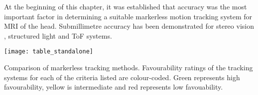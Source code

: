 \documentclass[class=article, crop=false]{standalone}
\begin{document}
At the beginning of this chapter, it was established that accuracy was the most important factor in determining a suitable markerless motion tracking system for MRI of the head. Submillimetre accuracy has been demonstrated for stereo vision \parencite{Kyme2014}, structured light \parencite{Olesen2012} and ToF \parencite{Noonan2015} systems.

\begin{table}[!h]
	\centering
	\texttt{[image: table\_standalone]}
	\caption{Comparison of markerless tracking methods. Favourability ratings of the tracking systems for each of the criteria listed are colour-coded. Green represents high favourability, yellow is intermediate and red represents low favouability.}
	\label{table}
\end{table}	
	
	
\end{document}

